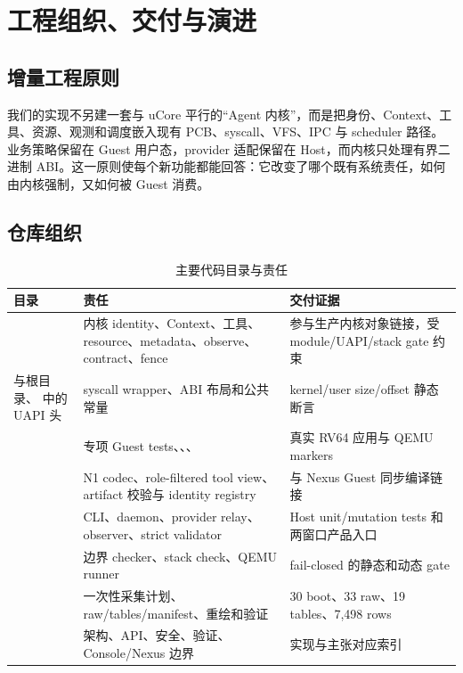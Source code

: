 \chapter{工程组织、交付与演进}
\label{chap:engineering}

\section{增量工程原则}

我们的实现不另建一套与 uCore 平行的“Agent 内核”，而是把身份、Context、工具、资源、观测和调度嵌入现有 PCB、syscall、VFS、IPC 与 scheduler 路径。业务策略保留在 Guest 用户态，provider 适配保留在 Host，而内核只处理有界二进制 ABI。这一原则使每个新功能都能回答：它改变了哪个既有系统责任，如何由内核强制，又如何被 Guest 消费。

\section{仓库组织}

\begin{table}[htbp]
  \centering
  \caption{主要代码目录与责任}
  \label{tab:repo-layout}
  \begin{tabularx}{\textwidth}{L{3.4cm}Y Y}
    \toprule
    目录 & 责任 & 交付证据 \\
    \midrule
     & 内核 identity、Context、工具、resource、metadata、observe、contract、fence & 参与生产内核对象链接，受 module/UAPI/stack gate 约束 \\
     与根目录、 中的 UAPI 头 & syscall wrapper、ABI 布局和公共常量 & kernel/user size/offset 静态断言 \\
     & 专项 Guest tests、、、 & 真实 RV64 应用与 QEMU markers \\
     & N1 codec、role-filtered tool view、artifact 校验与 identity registry & 与 Nexus Guest 同步编译链接 \\
     & CLI、daemon、provider relay、observer、strict validator & Host unit/mutation tests 和两窗口产品入口 \\
     & 边界 checker、stack check、QEMU runner & fail-closed 的静态和动态 gate \\
     & 一次性采集计划、raw/tables/manifest、重绘和验证 & 30 boot、33 raw、19 tables、7,498 rows \\
     & 架构、API、安全、验证、Console/Nexus 边界 & 实现与主张对应索引 \\
    \bottomrule
  \end{tabularx}
\end{table}

